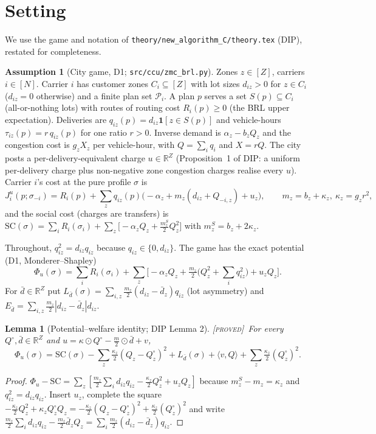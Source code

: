 \documentclass[11pt]{article}
\newtheorem{lemma}[theorem]{Lemma}
\theoremstyle{definition}
\newtheorem{assumption}{Assumption}
\theoremstyle{remark}
\newcommand{\R}{\mathbb{R}}
\newcommand{\cP}{\mathcal{P}}
\newcommand{\ip}[2]{\langle #1,#2\rangle}
\newcommand{\dbar}{\bar d}
\newcommand{\SC}{\mathrm{SC}}
\newcommand{\PROVED}{{\normalfont\textsc{[proved]}}}
\begin{document}
\section{Setting}\label{sec:setting}

We use the game and notation of \texttt{theory/new\_algorithm\_C/theory.tex} (DIP), restated for completeness.

\begin{assumption}[City game, D1; \texttt{src/ccu/zmc\_brl.py}]\label{ass:game}
Zones $z\in[Z]$, carriers $i\in[N]$. Carrier $i$ has customer zones $C_i\subseteq[Z]$ with lot sizes $d_{iz}>0$ for $z\in C_i$ ($d_{iz}=0$ otherwise) and a finite plan set $\cP_i$. A plan $p$ serves a set $S(p)\subseteq C_i$ (all-or-nothing lots) with routes of routing cost $R_i(p)\ge0$ (the BRL upper expectation). Deliveries are $q_{iz}(p)=d_{iz}\mathbf 1[z\in S(p)]$ and vehicle-hours $\tau_{iz}(p)=r\,q_{iz}(p)$ for one ratio $r>0$. Inverse demand is $\alpha_z-b_zQ_z$ and the congestion cost is $g_zX_z$ per vehicle-hour, with $Q=\sum_iq_i$ and $X=rQ$. The city posts a per-delivery-equivalent charge $u\in\R^Z$ (Proposition~1 of DIP: a uniform per-delivery charge plus non-negative zone congestion charges realise every $u$). Carrier $i$'s cost at the pure profile $\sigma$ is
\[J^u_i(p;\sigma_{-i})=R_i(p)+\sum_zq_{iz}(p)\big(-\alpha_z+m_z(d_{iz}+Q_{-i,z})+u_z\big),\qquad m_z=b_z+\kappa_z,\ \kappa_z=g_zr^2,\]
and the social cost (charges are transfers) is $\SC(\sigma)=\sum_iR_i(\sigma_i)+\sum_z\big[-\alpha_zQ_z+\tfrac{m^S_z}{2}Q_z^2\big]$ with $m^S_z=b_z+2\kappa_z$.
\end{assumption}

Throughout, $q_{iz}^2=d_{iz}q_{iz}$ because $q_{iz}\in\{0,d_{iz}\}$. The game has the exact potential (D1, Monderer--Shapley)
\begin{equation}\label{eq:pot}
\Phi_u(\sigma)=\sum_iR_i(\sigma_i)+\sum_z\Big[-\alpha_zQ_z+\tfrac{m_z}{2}\big(Q_z^2+\textstyle\sum_iq_{iz}^2\big)+u_zQ_z\Big].
\end{equation}
For $\dbar\in\R^Z$ put $L_{\dbar}(\sigma)=\sum_{i,z}\tfrac{m_z}{2}(d_{iz}-\dbar_z)q_{iz}$ (lot asymmetry) and $E_{\dbar}=\sum_{i,z}\tfrac{m_z}{2}|d_{iz}-\dbar_z|d_{iz}$.

\begin{lemma}[Potential--welfare identity; DIP Lemma 2]\label{lem:id}\PROVED\
For every $Q^\circ,\dbar\in\R^Z$ and $u=\kappa\odot Q^\circ-\tfrac m2\odot\dbar+v$,
\begin{equation}\label{eq:id}
\Phi_u(\sigma)=\SC(\sigma)-\sum_z\tfrac{\kappa_z}{2}(Q_z-Q^\circ_z)^2+L_{\dbar}(\sigma)+\ip{v}{Q}+\sum_z\tfrac{\kappa_z}{2}(Q^\circ_z)^2 .
\end{equation}
\end{lemma}
\begin{proof}
$\Phi_u-\SC=\sum_z[\tfrac{m_z}{2}\sum_id_{iz}q_{iz}-\tfrac{\kappa_z}{2}Q_z^2+u_zQ_z]$ because $m^S_z-m_z=\kappa_z$ and $q_{iz}^2=d_{iz}q_{iz}$. Insert $u_z$, complete the square $-\tfrac{\kappa_z}{2}Q_z^2+\kappa_zQ_z^\circ Q_z=-\tfrac{\kappa_z}{2}(Q_z-Q_z^\circ)^2+\tfrac{\kappa_z}{2}(Q_z^\circ)^2$ and write $\tfrac{m_z}{2}\sum_id_{iz}q_{iz}-\tfrac{m_z}{2}\dbar_zQ_z=\sum_i\tfrac{m_z}{2}(d_{iz}-\dbar_z)q_{iz}$.
\end{proof}
\end{document}
